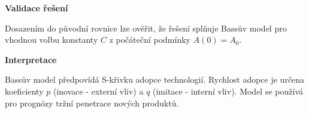 \begin{example}
\vspace{1.5\baselineskip}

\noindent\textbf{Validace řešení}

Dosazením do původní rovnice lze ověřit, že řešení splňuje Bassův model 
pro vhodnou volbu konstanty $C$ z počáteční podmínky $A(0) = A_0$.

\vspace{1.5\baselineskip}

\noindent\textbf{Interpretace}

Bassův model předpovídá S-křivku adopce technologií. Rychlost adopce je určena 
koeficienty $p$ (inovace - externí vliv) a $q$ (imitace - interní vliv). Model 
se používá pro prognózy tržní penetrace nových produktů.

\end{example}

\vspace{2\baselineskip}

